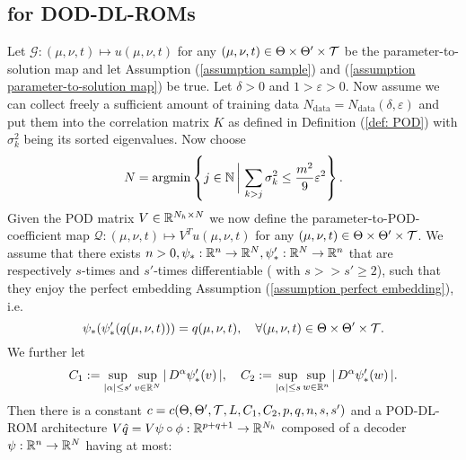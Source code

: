 \subsection{for DOD-DL-ROMs}



\begin{theorem} \label{theo: PAC bound for DOD-DL-ROM}
    Let $\mathcal{G}: (\mu, \nu, t) \mapsto u(\mu, \nu, t)$ for any $(\mu, \nu, t) \in \Theta \times \Theta' \times \mathcal{T}$ be the
    parameter-to-solution map and let Assumption (\ref{assumption sample}) and (\ref{assumption parameter-to-solution map}) be true. 
    Let $\delta > 0$ and $1 > \varepsilon > 0$.
    Now assume we can collect freely a sufficient amount of training data $N_{\text{data}} = 
    N_{\text{data}}(\delta, \varepsilon)$ and put them into the
    correlation matrix $K$ as defined in Definition (\ref{def: POD}) with $\sigma_k^2$ being its sorted eigenvalues. 
    Now choose
    \begin{equation*}
        N = \operatorname{argmin} \left\{ j \in \mathbb{N} \, \bigg\vert \, \sum_{k > j} \sigma^2_k \leq \frac{m^2}{9} \varepsilon^2 \right\}.
    \end{equation*}
    Given the POD matrix $V \in \mathbb{R}^{N_h \times N}$ we now define the parameter-to-POD-coefficient map 
    $\mathcal{Q}: (\mu, \nu, t) \mapsto V^T u(\mu, \nu, t)$ for 
    any $(\mu, \nu, t) \in \Theta \times \Theta' \times \mathcal{T}$. We assume that there exists 
    $n > 0, \psi_* : \mathbb{R}^n \to \mathbb{R}^N, \psi_*' : \mathbb{R}^N \to \mathbb{R}^n$ that are respectively $s$-times and
    $s'$-times differentiable ( with $s >> s' \geq 2$), such that they enjoy the perfect embedding 
    Assumption (\ref{assumption perfect embedding}), i.e. 
    \begin{equation*}
        \psi_*(\psi_*'(q(\mu, \nu, t))) = q(\mu, \nu, t), \quad \forall (\mu, \nu, t) \in \Theta \times \Theta' \times \mathcal{T}.
    \end{equation*}
    We further let 
    \begin{equation*}
        C_1 := \sup\limits_{\vert \alpha \vert \leq s'} \sup\limits_{v \in \mathbb{R}^N} \vert \, D^\alpha \psi_*'(v) \, \vert, \quad 
        C_2 := \sup\limits_{\vert \alpha \vert \leq s} \sup\limits_{w \in \mathbb{R}^n} \vert \, D^\alpha \psi_*'(w) \, \vert.
    \end{equation*}
    Then there is a constant $c = c(\Theta, \Theta', \mathcal{T}, L, C_1, C_2, p, q, n, s, s')$ and a POD-DL-ROM architecture $V \hat{q} =
    V \psi \circ \phi: \mathbb{R}^{p+q+1} \to \mathbb{R}^{N_h}$ composed of a decoder $\psi: \mathbb{R}^n \to \mathbb{R}^N$ having at most:

\end{theorem}
